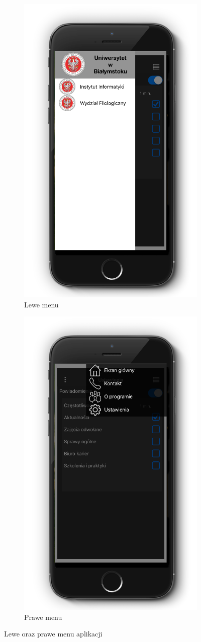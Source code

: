 \documentclass{iiuwb}
\begin{document}
\begin{figure}
\centering
\begin{subfigure}{.5\textwidth}
  \centering
  \includegraphics[width=.6\linewidth]{image/LeweIphone.png}
  \caption{Lewe menu}
  \label{fig:Lewe}
\end{subfigure}%
\begin{subfigure}{.5\textwidth}
  \centering
  \includegraphics[width=.6\linewidth]{image/PraweIphone.png}
  \caption{Prawe menu}
  \label{fig:Prawe}
\end{subfigure}
\caption{Lewe oraz prawe menu aplikacji}
\label{fig:Menu}
\end{figure}
\end{document}

